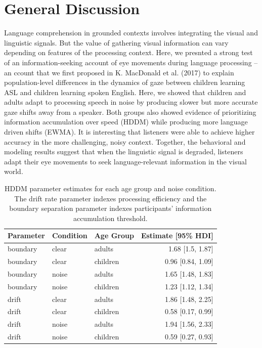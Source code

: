 \documentclass[10pt, letterpaper]{article}
\begin{document}
\section{General Discussion}\label{general-discussion}

Language comprehension in grounded contexts involves integrating the
visual and linguistic signals. But the value of gathering visual
information can vary depending on features of the processing context.
Here, we presnted a strong test of an information-seeking account of eye
movements during language processing -- an ccount that we first proposed
in K. MacDonald et al. (2017) to explain population-level differences in
the dynamics of gaze between children learning ASL and children learning
spoken English. Here, we showed that children and adults adapt to
processing speech in noise by producing slower but more accurate gaze
shifts away from a speaker. Both groups also showed evidence of
prioritizing information accumulation over speed (HDDM) while producing
more language driven shifts (EWMA). It is interesting that listeners
were able to achieve higher accuracy in the more challenging, noisy
context. Together, the behavioral and modeling results suggest that when
the linguistic signal is degraded, listeners adapt their eye movements
to seek language-relevant information in the visual world.

\begin{table}[t]
\centering
\begin{tabular}{lllr}
  \hline
Parameter & Condition & Age Group & Estimate [95\% HDI] \\ 
  \hline
boundary & clear & adults & 1.68 [1.5, 1.87] \\ 
  boundary & clear & children & 0.96 [0.84, 1.09] \\ 
  boundary & noise & adults & 1.65 [1.48, 1.83] \\ 
  boundary & noise & children & 1.23 [1.12, 1.34] \\ 
   \hline
drift & clear & adults & 1.86 [1.48, 2.25] \\ 
  drift & clear & children & 0.58 [0.17, 0.99] \\ 
  drift & noise & adults & 1.94 [1.56, 2.33] \\ 
  drift & noise & children & 0.59 [0.27, 0.93] \\ 
   \hline
\end{tabular}
\caption{HDDM parameter estimates for each age group and noise condition. The drift rate parameter indexes processing efficiency and the boundary separation parameter indexes participants' information accumulation threshold.} 
\end{table}
\end{document}
